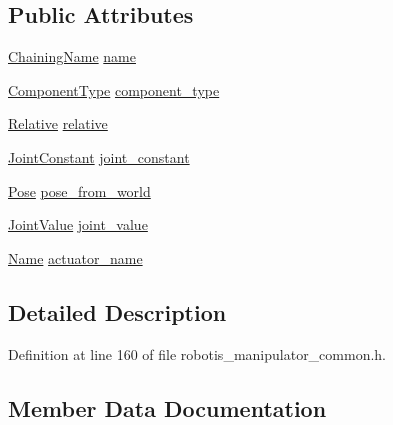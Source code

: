 \subsection*{Public Attributes}
\begin{DoxyCompactItemize}
\item 
\hyperlink{structrobotis__manipulator_1_1_chaining_name}{Chaining\+Name} \hyperlink{structrobotis__manipulator_1_1_component_a022aa062d295a3a6b5815a58b74e558f}{name}
\item 
\hyperlink{namespacerobotis__manipulator_a2bbf89d1c08dc1d9ff4e28beb939e382}{Component\+Type} \hyperlink{structrobotis__manipulator_1_1_component_ae597791dc579e168914ac36b66cf6172}{component\+\_\+type}
\item 
\hyperlink{structrobotis__manipulator_1_1_relative}{Relative} \hyperlink{structrobotis__manipulator_1_1_component_af1b86e91e0f92a214fa9e10464aba08f}{relative}
\item 
\hyperlink{structrobotis__manipulator_1_1_joint_constant}{Joint\+Constant} \hyperlink{structrobotis__manipulator_1_1_component_a39b967aba5061b7cd4e46c9a18d2e223}{joint\+\_\+constant}
\item 
\hyperlink{structrobotis__manipulator_1_1_pose}{Pose} \hyperlink{structrobotis__manipulator_1_1_component_a0b28dd5fe885ff8f07d75733d6e777fc}{pose\+\_\+from\+\_\+world}
\item 
\hyperlink{namespacerobotis__manipulator_aa0556c98c5294ccf3a96c2d0fe315e40}{Joint\+Value} \hyperlink{structrobotis__manipulator_1_1_component_a06de8406b177d397a1f998fdf9d67d95}{joint\+\_\+value}
\item 
\hyperlink{namespacerobotis__manipulator_a08c2d25e77a01ad75b9bb740f8ce4765}{Name} \hyperlink{structrobotis__manipulator_1_1_component_ac3407dba6190bf43305107fe7e443b6c}{actuator\+\_\+name}
\end{DoxyCompactItemize}


\subsection{Detailed Description}


Definition at line 160 of file robotis\+\_\+manipulator\+\_\+common.\+h.



\subsection{Member Data Documentation}
